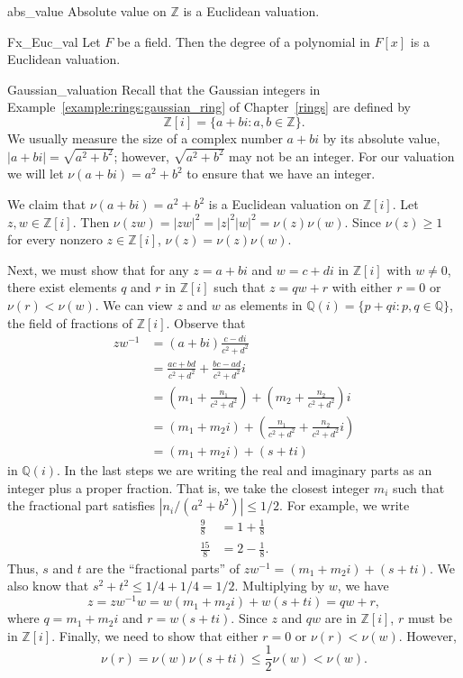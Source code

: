 \begin{example}{abs_value}
Absolute value on ${\mathbb Z}$ is a Euclidean valuation.
\end{example}


\begin{example}{Fx_Euc_val}
Let $F$ be a field. Then the degree of a polynomial in $F[x]$ is a Euclidean valuation. 
\end{example}


\begin{example}{Gaussian_valuation}
Recall that the Gaussian integers in Example~\ref{example:rings:gaussian_ring} of Chapter~\ref{rings} are defined by
\[
{\mathbb Z}[i] = \{  a + b i : a, b \in {\mathbb Z} \}.
\]
We usually measure the size of a complex number $a + bi$ by its absolute value, $|a + bi| = \sqrt{ a^2 + b^2}$; however, $\sqrt{a^2 + b^2}$ may not be an integer. For our valuation we will let $\nu(a + bi) = a^2 + b^2$ to ensure that we have an integer.  

We claim that $\nu( a+ bi) = a^2 + b^2$ is a Euclidean valuation on ${\mathbb Z}[i]$. Let $z, w \in {\mathbb Z}[i]$.  Then $\nu( zw) = |zw|^2 =
|z|^2 |w|^2  = \nu(z) \nu(w)$.  Since $\nu(z) \geq 1$ for every nonzero $z \in {\mathbb Z}[i]$, $\nu( z) = \nu(z) \nu(w)$.

Next, we must show that for any $z= a+bi$ and $w = c+di$ in ${\mathbb Z}[i]$ with $w \neq 0$, there exist elements $q$ and $r$ in 
${\mathbb Z}[i]$  such that $z = qw + r$ with either $r=0$ or  $\nu(r) < \nu(w)$.  We can view $z$ and $w$ as elements in ${\mathbb
Q}(i) = \{ p + qi : p, q \in {\mathbb Q} \}$, the field of fractions of ${\mathbb Z}[i]$.  Observe that
\begin{align*}
z w^{-1} & = (a +b i) \frac{c -d i}{c^2 + d^2} \\
& =
\frac{ac + b d}{c^2 + d^2} + \frac{b c -ad}{c^2 + d^2}i \\
& =
\left( 
m_1 + \frac{n_1}{c^2 + d^2}
\right)
+ 
\left(
m_2 + \frac{n_2}{c^2 + d^2}
\right) i \\
& =
(m_1 + m_2 i) + \left( 
\frac{n_1}{c^2 + d^2}
+ 
\frac{n_2}{c^2 + d^2}i
\right) \\
& =
(m_1 + m_2 i) + (s + ti)
\end{align*}
in ${\mathbb Q}(i)$.  In the last steps we are writing the real and imaginary parts as an integer plus a proper fraction.  That is, we take
the closest integer $m_i$ such that the fractional part satisfies $|n_i / (a^2 + b^2)| \leq 1/2$.  For example, we write 
\begin{align*}
\frac{9}{8} & = 1 + \frac{1}{8} \\
\frac{15}{8} & = 2 - \frac{1}{8}.
\end{align*}
Thus, $s$ and $t$ are the ``fractional parts'' of $z w^{-1} = (m_1 + m_2 i) + (s + ti)$. We also know that $s^2 + t^2 \leq 1/4 + 1/4 =
1/2$.  Multiplying by $w$, we have
\[
z = z w^{-1} w = w (m_1 + m_2 i) + w (s + ti)  = q w + r,
\]
where $q = m_1 + m_2 i$ and $r =  w (s + ti)$.  Since $z$ and $qw$ are in ${\mathbb Z}[i]$, $r$ must be in ${\mathbb Z}[i]$.  Finally, we need to show that either $r = 0$ or $\nu(r) < \nu(w)$.  However,
\[
\nu(r) = \nu(w) \nu(s + ti) \leq \frac{1}{2} \nu(w) < \nu(w).
\]
\end{example}

